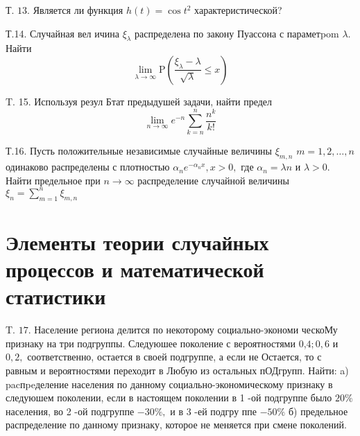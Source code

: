 \documentclass[a4paper,12pt]{article} %
\begin{document}
\begin{example}

Т. $13 .$ Является ли функция $h(t)=\cos t^{2}$ характеристической?




\end{example}



\begin{example}

Т.14. Случайная вел ичина $\xi_{\lambda}$ распределена по закону Пуассона с параметpom $\lambda .$ Найти
$$
\lim _{\lambda \rightarrow \infty} \mathrm{P}\left(\frac{\xi_{\lambda}-\lambda}{\sqrt{\lambda}} \leqslant x\right)
$$




\end{example}



\begin{example}

T. 15. Используя резул Бтат предыдушей задачи, найти предел
$$
\lim _{n \rightarrow \infty} e^{-n} \sum_{k=n}^{n} \frac{n^{k}}{k !}
$$




\end{example}





\begin{example}

Т.16. Пусть положительные независимые случайные величины $\xi_{m, n}$ $m=1,2, \ldots, n$ одинаково распределены с плотностью $\alpha_{n} e^{-\alpha_{n} x}, x>0,$ где $\alpha_{n}=\lambda n$ и $\lambda>0 .$ Найти предельное при $n \rightarrow \infty$ распределение случайной величины $\xi_{n}=\sum_{m=1}^{n} \xi_{m, n}$




\end{example}


\section{Элементы теории случайных процессов и математической статистики}




\begin{example}


T. $17 .$ Население региона делится по некоторому социально-экономи ческоМу признаку на три подгруппы. Следуюшее поколение с вероятностями 0,$4 ; 0,6$ и $0,2,$ соответственно, остается в своей подгруппе, а если не
Остается, то с равным и вероятностями переходит в Любую из остальных пОДгрупп. Найти:
a) pacпpeделение населения по данному социально-экономическому признаку в следуюшем поколении, если в настоящем поколении в 1 -ой подгруппе было $20 \%$ населения, во 2 -ой подгруппе $-30 \%,$ и в 3 -ей подгру ппе $-50 \%$
б) предельное распределение по данному признаку, которое не меняется при смене поколений.



\end{example}
\end{document}
